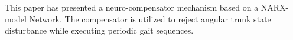 
This paper has presented a neuro-compensator mechanism based on a NARX-model Network.
The compensator is utilized to reject angular trunk state disturbance while executing
periodic gait sequences.